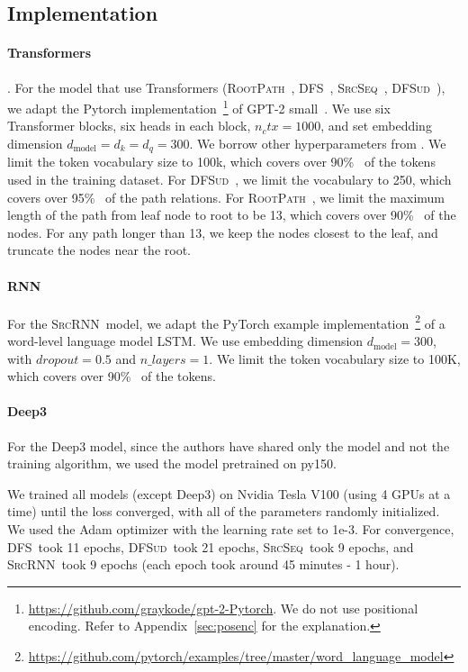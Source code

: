 \documentclass[nonacm, sigconf]{acmart}
\newcommand{\model}{\text{model}}
\newcommand{\abbr}[1]{\textsc{#1}~}
\newcommand{\SrcSeq}{\abbr{SrcSeq}} \newcommand{\SrcRNN}{\abbr{SrcRNN}} \newcommand{\LeafSeq}{\abbr{LeafSeq}} \newcommand{\RootPath}{\abbr{RootPath}} \newcommand{\LeafTokens}{\abbr{LeafTokens}} \newcommand{\DFS}{\abbr{DFS}} \newcommand{\TreeRel}{\abbr{DFS{ud}}} \newcommand{\TreeReli}{\abbr{DFS{ud+}}}
\begin{document}
\subsection{Implementation}

\paragraph{Transformers}. For the model that use Transformers (\RootPath, \DFS, \SrcSeq, \TreeRel), we adapt the Pytorch implementation~\footnote{\url{https://github.com/graykode/gpt-2-Pytorch}. We do not use positional encoding. Refer to Appendix~\ref{sec:posenc} for the explanation.}  of GPT-2 small~\citep{radford2019language-gpt2}.
We use six Transformer blocks, six heads in each block, $n_ctx = 1000$, and set embedding dimension $d_\model = d_k = d_q = 300$. We borrow other hyperparameters from \citet{radford2019language-gpt2}.
We limit the token vocabulary size to 100k, which covers over 90\%~ of the tokens used in the training dataset.
For \TreeRel, we limit the vocabulary to 250, which covers over 95\%~ of the path relations. For \RootPath, we limit the maximum length of the path from leaf node to root to be 13, which covers over 90\%~ of the nodes. For any path longer than 13, we keep the nodes closest to the leaf, and truncate the nodes near the root.

\paragraph{RNN} For the \SrcRNN model, we adapt the PyTorch example implementation~\footnote{\url{https://github.com/pytorch/examples/tree/master/word_language_model}} of a word-level language model LSTM. We use embedding dimension $d_\model = 300$, with $dropout = 0.5$ and $n\_layers = 1$. We limit the token vocabulary size to 100K, which covers over 90\%~ of the tokens.

\paragraph{Deep3} For the Deep3 model, since the authors have shared only the model and not the training algorithm, we used the model pretrained on py150.

We trained all models (except Deep3) on Nvidia Tesla V100 (using 4 GPUs at a time) until the loss converged, with all of the parameters randomly initialized. We used the Adam optimizer with the learning rate set to 1e-3. For convergence, \DFS took 11 epochs, \TreeRel took 21 epochs, \SrcSeq took 9 epochs, and \SrcRNN took 9 epochs (each epoch took around 45 minutes - 1 hour). 
\end{document}
